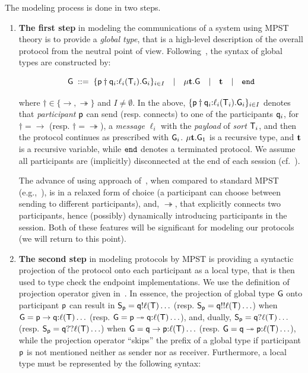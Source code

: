 The modeling process is done in two steps.

\begin{enumerate}[start=1,label={(\bfseries \arabic*)}]
	\item \textbf{The first step} in modeling the communications of a system using MPST theory is to provide a \emph{global type}, that is a high-level description of the overall protocol from the neutral point of view. Following~\cite{HuY17}, the syntax of global types are constructed by:
	
	\begin{equation}
	{\sf G} \; ::= \;
	\{{\sf p}\dagger{\sf q}_i{:}\ell_i({\mathsf T}_i).{\sf G}_i\}_{i\in I}  \quad | \quad 
	\mu \textbf{t}.{\sf G} \quad | \quad 
	\textbf{t} \quad | \quad
	\mathtt{end}
	\end{equation}
	
	\noindent
	where $\dagger\in\{\to, \twoheadrightarrow\}$ and $I\not=\emptyset$. 
	In the above, $\{{\sf p}\dagger{\sf q}_i{:}\ell_i({\mathsf T}_i).{\sf G}_i\}_{i\in I}$
	denotes that \emph{participant} ${\sf p}$ can send (resp. connects) to one of the participants ${\sf q}_i$, 
	for $\dagger=\to$ (resp. $\dagger=\twoheadrightarrow$), 
	a \emph{message} $\ell_i$ with the \emph{payload} of \emph{sort} ${\mathsf T}_i$, 
	and then the protocol continues as prescribed with ${\sf G}_i$.  
	$\mu \textbf{t}.{\sf G}_1$ is a recursive type, and $\textbf{t}$ is a recursive variable, 
	while $\mathtt{end}$ denotes a terminated protocol. We assume all participants are (implicitly) disconnected at the end of each session (cf.~\cite{HuY17}). 
	
	The advance of using approach of~\cite{HuY17}, when compared to standard MPST (e.g.,~\cite{HondaYC08}),
	is in a relaxed form of choice (a participant can choose between sending to different participants), 
	and, $\twoheadrightarrow$, that explicitly connects two participants, hence (possibly) dynamically 
	introducing participants in the session.
	Both of these features will be significant for modeling our protocols (we will return to this point).
	
	\item \textbf{The second step} in modeling protocols by MPST is providing a syntactic projection of the protocol onto each participant as a local type, that is then used to
	type check the endpoint implementations.  
	We use the definition of projection operator given in~\cite[Figure \ref{fig:fig2}]{HuY17}. 
	In essence, the projection of global type ${\sf G}$ onto participant ${\sf p}$ can result in 
	${\mathsf S}_{\sf p}={\sf q}{!}\ell({\mathsf T})\ldots$ (resp. ${\mathsf S}_{\sf p}={\sf q}{!!}\ell({\mathsf T})\ldots$) 
	when ${\sf G}={\sf p}\to{\sf q}{:}\ell({\mathsf T})\ldots$ (resp. ${\sf G}={\sf p}\twoheadrightarrow{\sf q}{:}\ell({\mathsf T})\ldots$), 
	and, dually, ${\mathsf S}_{\sf p}={\sf q}{?}\ell({\mathsf T})\ldots$ (resp. ${\mathsf S}_{\sf p}={\sf q}{??}\ell({\mathsf T})\ldots$) when ${\sf G}={\sf q}\to{\sf p}{:}\ell({\mathsf T})\ldots$ 
	(resp. ${\sf G}={\sf q}\twoheadrightarrow{\sf p}{:}\ell({\mathsf T})\ldots$), 
	while the projection operator ``skips'' the prefix of a global type if participant ${\sf p}$ is not mentioned neither as sender nor as receiver. Furthermore, a local type must be represented by the following syntax:
	

\end{enumerate}

